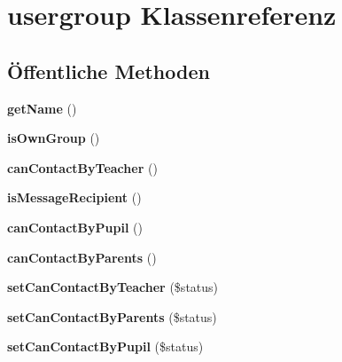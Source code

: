 \hypertarget{classusergroup}{}\section{usergroup Klassenreferenz}
\label{classusergroup}
\subsection*{Öffentliche Methoden}
\begin{DoxyCompactItemize}
\item 
\mbox{\label{classusergroup_a50d40c8fa040f7225283ccfe44fc16b1}} 
{\bfseries get\+Name} ()
\item 
\mbox{\label{classusergroup_a11d5efd24dc60e21dd563d1aee1928e3}} 
{\bfseries is\+Own\+Group} ()
\item 
\mbox{\label{classusergroup_a0aa4469f95da8a8ea3db2fbbdfa3fe67}} 
{\bfseries can\+Contact\+By\+Teacher} ()
\item 
\mbox{\label{classusergroup_a857b9af35bbbf7df4a50a645c71e3021}} 
{\bfseries is\+Message\+Recipient} ()
\item 
\mbox{\label{classusergroup_a97f7414740278944144afc8eb95867db}} 
{\bfseries can\+Contact\+By\+Pupil} ()
\item 
\mbox{\label{classusergroup_af495e5bb44a6db86ffec0f94f810ea5f}} 
{\bfseries can\+Contact\+By\+Parents} ()
\item 
\mbox{\label{classusergroup_ad1e06e0ecb2e529f34bdeaee1aaccd80}} 
{\bfseries set\+Can\+Contact\+By\+Teacher} (\$status)
\item 
\mbox{\label{classusergroup_a7747f661e12b606e65f8b94e93bf5d91}} 
{\bfseries set\+Can\+Contact\+By\+Parents} (\$status)
\item 
\mbox{\label{classusergroup_a9ac36ac12a9d9e23a2d59692a83c9687}} 
{\bfseries set\+Can\+Contact\+By\+Pupil} (\$status)
\item 
\mbox{\label{classusergroup_aad983dfcff0ebdcd33debf9ea35652c2}} 

\end{DoxyCompactItemize}
